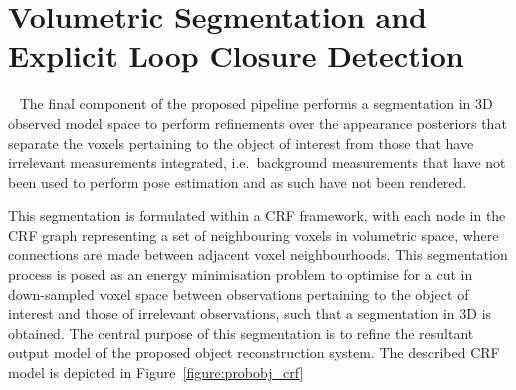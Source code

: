 \section{Volumetric Segmentation and Explicit Loop Closure Detection}
~\label{sec:probobj_segmentation}
The final component of the proposed pipeline performs a segmentation in 3D 
observed model space to perform refinements over the appearance
posteriors that separate the voxels pertaining to the object of interest from
those that have irrelevant measurements integrated, i.e.\ background measurements
that have not been used to perform pose estimation and as such have not been rendered.

This segmentation is formulated within a CRF framework, with each node in the
CRF graph representing a set of neighbouring voxels in volumetric space, where connections
are made between adjacent voxel neighbourhoods. This segmentation process is
posed as an energy minimisation problem to optimise for a cut in down-sampled
voxel space between observations pertaining to the object of interest and those
of irrelevant observations, such that a segmentation in 3D is obtained. The
central purpose of this segmentation is to refine the resultant output model of
the proposed object reconstruction system. The described CRF model is depicted
in Figure~\ref{figure:probobj_crf}

